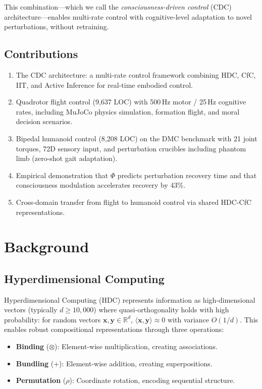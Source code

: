 \documentclass[11pt,a4paper]{article}
\begin{document}
This combination---which we call the \emph{consciousness-driven control} (CDC) architecture---enables multi-rate control with cognitive-level adaptation to novel perturbations, without retraining.

\subsection{Contributions}

\begin{enumerate}
  \item The CDC architecture: a multi-rate control framework combining HDC, CfC, IIT, and Active Inference for real-time embodied control.
  \item Quadrotor flight control (9,637 LOC) with 500\,Hz motor / 25\,Hz cognitive rates, including MuJoCo physics simulation, formation flight, and moral decision scenarios.
  \item Bipedal humanoid control (8,208 LOC) on the DMC benchmark with 21 joint torques, 72D sensory input, and perturbation crucibles including phantom limb (zero-shot gait adaptation).
  \item Empirical demonstration that $\Phi$ predicts perturbation recovery time and that consciousness modulation accelerates recovery by 43\%.
  \item Cross-domain transfer from flight to humanoid control via shared HDC-CfC representations.
\end{enumerate}

\section{Background}
\label{sec:background}

\subsection{Hyperdimensional Computing}

Hyperdimensional Computing (HDC) \citep{kanerva2009hyperdimensional, plate1995holographic} represents information as high-dimensional vectors (typically $d \geq 10{,}000$) where quasi-orthogonality holds with high probability: for random vectors $\mathbf{x}, \mathbf{y} \in \mathbb{R}^d$, $\langle \mathbf{x}, \mathbf{y} \rangle \approx 0$ with variance $O(1/d)$.
This enables robust compositional representations through three operations:
\begin{itemize}
  \item \textbf{Binding} ($\otimes$): Element-wise multiplication, creating associations.
  \item \textbf{Bundling} ($+$): Element-wise addition, creating superpositions.
  \item \textbf{Permutation} ($\rho$): Coordinate rotation, encoding sequential structure.
\end{itemize}
\end{document}

